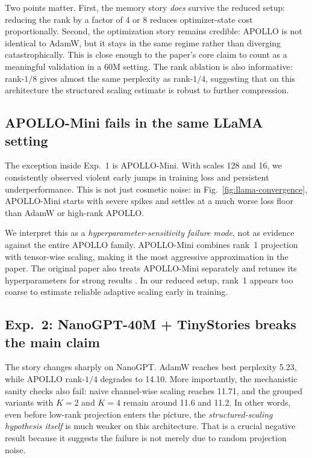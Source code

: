 \documentclass[10pt]{article}
\begin{document}
Two points matter. First, the memory story \emph{does} survive the reduced setup: reducing the rank by a factor of 4 or 8 reduces optimizer-state cost proportionally. Second, the optimization story remains credible: APOLLO is not identical to AdamW, but it stays in the same regime rather than diverging catastrophically. This is close enough to the paper's core claim to count as a meaningful validation in a 60M setting. The rank ablation is also informative: rank-$1/8$ gives almost the same perplexity as rank-$1/4$, suggesting that on this architecture the structured scaling estimate is robust to further compression.

\subsection{APOLLO-Mini fails in the same LLaMA setting}
The exception inside Exp.~1 is APOLLO-Mini. With scales 128 and 16, we consistently observed violent early jumps in training loss and persistent underperformance. This is not just cosmetic noise: in Fig.~\ref{fig:llama-convergence}, APOLLO-Mini starts with severe spikes and settles at a much worse loss floor than AdamW or high-rank APOLLO.

We interpret this as a \emph{hyperparameter-sensitivity failure mode}, not as evidence against the entire APOLLO family. APOLLO-Mini combines rank~1 projection with tensor-wise scaling, making it the most aggressive approximation in the paper. The original paper also treats APOLLO-Mini separately and retunes its hyperparameters for strong results \cite{apollo2025}. In our reduced setup, rank~1 appears too coarse to estimate reliable adaptive scaling early in training.

\subsection{Exp.~2: NanoGPT-40M + TinyStories breaks the main claim}
The story changes sharply on NanoGPT. AdamW reaches best perplexity 5.23, while APOLLO rank-$1/4$ degrades to 14.10. More importantly, the mechanistic sanity checks also fail: naive channel-wise scaling reaches 11.71, and the grouped variants with $K=2$ and $K=4$ remain around 11.6 and 11.2. In other words, even before low-rank projection enters the picture, the \emph{structured-scaling hypothesis itself} is much weaker on this architecture. That is a crucial negative result because it suggests the failure is not merely due to random projection noise.
\end{document}
